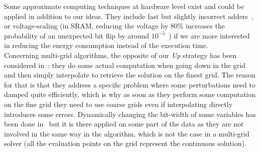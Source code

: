 
   
   Some approximate computing techniques at hardware level exist and could be applied in addition to our ideas. They include fast but slightly incorrect adders~\cite{Gupta:2011}, or voltage-scaling (in SRAM, reducing
   the voltage by 80\% increases the probability of an unexpected bit flip by around $10^{-5}$~\cite{Sampson:2011})
   if we are more interested in reducing the energy consumption instead of the execution time.\\
   Concerning multi-grid algorithms, the opposite of our \emph{Up} strategy has been considered in~\cite{JAMESON}: they do some actual computation when going down in the grid and then simply interpolate to retrieve the solution on the finest grid. The reason for that is that they
   address a specific problem where some perturbations need to damped quite efficiently, which is why as soon as they perform some computation on the fine grid they need to use coarse grids even if interpolating directly introduces some errors.
   Dynamically changing the bit-width of some variables has been done in~\cite{Park:2010} but it is there applied on some part of the data as they are not involved in the same way in the algorithm,
   which is not the case in a multi-grid solver (all the evaluation points on the grid represent the continuous solution).